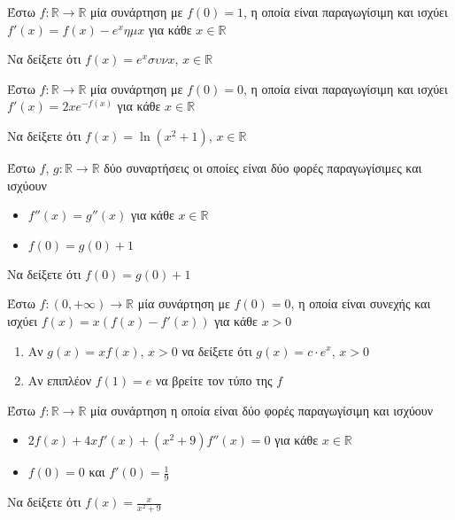 \documentclass{presentation}
\begin{document}
\begin{askisi}
    Έστω $f:\mathbb{R}\to\mathbb{R}$ μία συνάρτηση με $f(0)=1$, η οποία είναι παραγωγίσιμη και ισχύει $f'(x)=f(x)-e^xημx$ για κάθε $x\in\mathbb{R}$

    Να δείξετε ότι $f(x)=e^xσυνx$, $x\in\mathbb{R}$

\end{askisi}

\begin{askisi}
    Έστω $f:\mathbb{R}\to\mathbb{R}$ μία συνάρτηση με $f(0)=0$, η οποία είναι παραγωγίσιμη και ισχύει $f'(x)=2xe^{-f(x)}$ για κάθε $x\in\mathbb{R}$

    Να δείξετε ότι $f(x)=\ln (x^2+1)$, $x\in\mathbb{R}$

\end{askisi}

\begin{askisi}
    Έστω $f$, $g:\mathbb{R}\to\mathbb{R}$ δύο συναρτήσεις οι οποίες είναι δύο φορές παραγωγίσιμες και ισχύουν
    \begin{itemize}
        \item $f''(x)=g''(x)$ για κάθε $x\in\mathbb{R}$
        \item $f(0)=g(0)+1$
    \end{itemize}

    Να δείξετε ότι $f(0)=g(0)+1$

\end{askisi}

\begin{askisi}
    Έστω $f:(0,+\infty)\to\mathbb{R}$ μία συνάρτηση με $f(0)=0$, η οποία είναι συνεχής και ισχύει $f(x)=x(f(x)-f'(x))$ για κάθε $x>0$
    \begin{enumerate}
        \item<1-> Αν $g(x)=xf(x)$, $x>0$ να δείξετε ότι $g(x)=c\cdot e^x$, $x>0$
        \item<2-> Αν επιπλέον $f(1)=e$ να βρείτε τον τύπο της $f$
    \end{enumerate}

\end{askisi}

\begin{askisi}
    Έστω $f:\mathbb{R}\to\mathbb{R}$ μία συνάρτηση η οποία είναι δύο φορές παραγωγίσιμη και ισχύουν
    \begin{itemize}
        \item $2f(x)+4xf'(x)+(x^2+9)f''(x)=0$ για κάθε $x\in\mathbb{R}$
        \item $f(0)=0$ και $f'(0)=\frac{1}{9}$
    \end{itemize}

    Να δείξετε ότι $f(x)=\frac{x}{x^2+9}$

\end{askisi}
\end{document}

